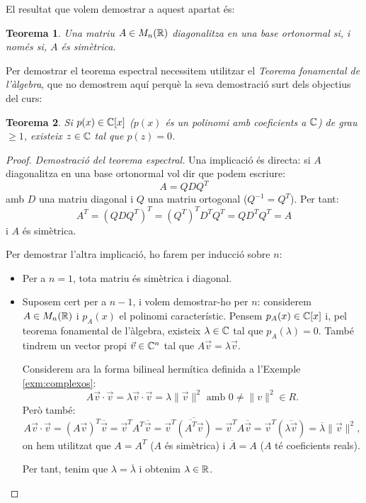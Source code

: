 \documentclass[
  11pt,
]{book}
\numberwithin{dummy}{section}
\theoremstyle{maincolornumbox}
\newtheorem{theorem}{TTTT}[chapter]
\newtheorem{theoremeT}{Teorema}[chapter]
\theoremstyle{blacknumex}
\theoremstyle{blacknumbox}
\theoremstyle{maincolornum}
\renewenvironment{theorem}{\begin{tBox}\begin{theoremeT}}{\end{theoremeT}\end{tBox}}
\newlength\esp
\begin{document}
El resultat que volem demostrar a aquest apartat és:

\begin{theorem}
Una matriu \(A\in M_n(\mathbb{R})\) diagonalitza en una base ortonormal si, i
només si, \(A\) és simètrica.
\end{theorem}

Per demostrar el teorema espectral necessitem utilitzar el \emph{Teorema
fonamental de l'àlgebra}, que no demostrem aquí perquè la seva
demostració surt dels objectius del curs:

\begin{theorem}
Si \(p(x)\in\mathbb{C}[x]\) (\(p(x)\) és un polinomi amb coeficients a \(\mathbb{C}\)) de grau
\(\geq 1\), existeix \(z\in \mathbb{C}\) tal que \(p(z)=0\).
\end{theorem}

\begin{proof}

\emph{Demostració del teorema espectral.} Una implicació és directa: si \(A\)
diagonalitza en una base ortonormal vol dir que podem escriure:
\[A=Q D Q^T\] amb \(D\) una matriu diagonal i \(Q\) una matriu ortogonal
(\(Q^{-1}=Q^T\)). Per tant: \[A^T=(QDQ^T)^T=(Q^T)^T D^T Q^T=Q D^T Q^T=A\]
i \(A\) és simètrica.

Per demostrar l'altra implicació, ho farem per inducció sobre \(n\):

\begin{itemize}
\item
  Per a \(n=1\), tota matriu és simètrica i diagonal.
\item
  Suposem cert per a \(n-1\), i volem demostrar-ho per \(n\): considerem
  \(A\in M_n(\mathbb{R})\) i \(p_A(x)\) el polinomi característic. Pensem
  \(p_A(x)\in\mathbb{C}[x]\) i, pel teorema fonamental de l'àlgebra, existeix
  \(\lambda \in \mathbb{C}\) tal que \(p_A(\lambda)=0\). També tindrem un vector
  propi \(\vec v\in \mathbb{C}^n\) tal que \(A \vec v=\lambda \vec v\).

  Considerem ara la forma bilineal hermítica definida a l'Exemple
  \ref{exm:complexos}:
  \[A\vec v \cdot \vec v = \lambda \vec v \cdot \vec v= \lambda \|\vec v\|^2 \text{ amb $0\neq \|v\|^2\in R$}.\]
  Però també:
  \[A\vec v \cdot\vec  v = (A \vec v)^T \overline{\vec v} = \vec v^T A^T \overline{\vec v} = \vec v^T \overline{(\overline{A^T} \vec v)} = \vec v^T A \overline{\vec v} = \vec v^T (\overline{\lambda \vec v})=\overline{\lambda} \|\vec v\|^2 ,\]
  on hem utilitzat que \(A=A^T\) (\(A\) és simètrica) i \(\overline A=A\)
  (\(A\) té coeficients reals).

  Per tant, tenim que \(\lambda=\overline{\lambda}\) i obtenim
  \(\lambda \in \mathbb{R}\).


\end{itemize}
\end{proof}
\end{document}
